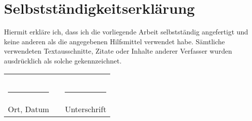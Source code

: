 \clearpage
\thispagestyle{empty}
\section*{Selbstständigkeitserklärung}
Hiermit erkläre ich, dass ich die vorliegende Arbeit selbstständig angefertigt
und keine anderen als die angegebenen Hilfsmittel verwendet habe. Sämtliche
verwendeten Textausschnitte, Zitate oder Inhalte anderer Verfasser wurden
ausdrücklich als solche gekennzeichnet.

\begin{table}[h!]
	\begin{tabular}{l l l}
		& & \\
		& & \\
		& & \\
		\rule{5cm}{0.25pt} & & \rule{5cm}{0.25pt} \\
		Ort, Datum & & Unterschrift
	\end{tabular}
\end{table}

\clearpage
